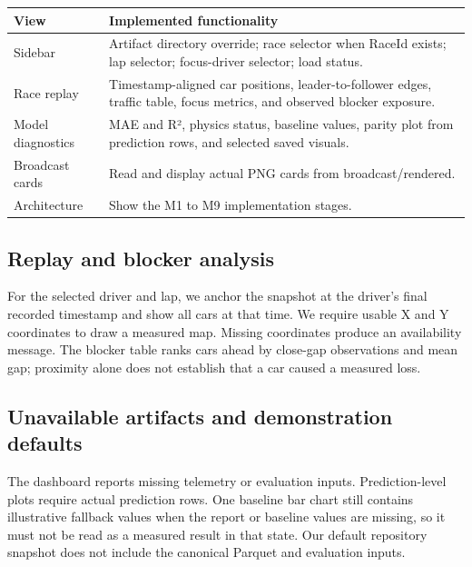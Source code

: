 \documentclass[11pt,a4paper,oneside]{report}
\begin{document}

\begin{center}\small\begin{tabularx}{\textwidth}{@{}>{\raggedright\arraybackslash}X>{\raggedright\arraybackslash}X@{}}

\toprule

View & Implemented functionality \\

\midrule

Sidebar & Artifact directory override; race selector when RaceId exists; lap selector; focus-driver selector; load status. \\

Race replay & Timestamp-aligned car positions, leader-to-follower edges, traffic table, focus metrics, and observed blocker exposure. \\

Model diagnostics & MAE and R², physics status, baseline values, parity plot from prediction rows, and selected saved visuals. \\

Broadcast cards & Read and display actual PNG cards from broadcast/rendered. \\

Architecture & Show the M1 to M9 implementation stages. \\

\bottomrule\end{tabularx}\end{center}

\subsection*{Replay and blocker analysis}

For the selected driver and lap, we anchor the snapshot at the driver’s final recorded timestamp and show all cars at that time. We require usable X and Y coordinates to draw a measured map. Missing coordinates produce an availability message. The blocker table ranks cars ahead by close-gap observations and mean gap; proximity alone does not establish that a car caused a measured loss.

\subsection*{Unavailable artifacts and demonstration defaults}

The dashboard reports missing telemetry or evaluation inputs. Prediction-level plots require actual prediction rows. One baseline bar chart still contains illustrative fallback values when the report or baseline values are missing, so it must not be read as a measured result in that state. Our default repository snapshot does not include the canonical Parquet and evaluation inputs.
\end{document}
